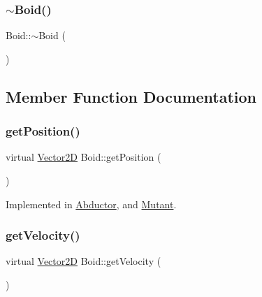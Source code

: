\hypertarget{class_boid_a712f84ddc1b8ad06ad7ecd6c10a1666c}{}\label{class_boid_a712f84ddc1b8ad06ad7ecd6c10a1666c} 
\subsubsection{\texorpdfstring{$\sim$\+Boid()}{~Boid()}}
{\footnotesize\ttfamily Boid\+::$\sim$\+Boid (\begin{DoxyParamCaption}{ }\end{DoxyParamCaption})\hspace{0.3cm}{\ttfamily [virtual]}}



\subsection{Member Function Documentation}
\hypertarget{class_boid_a32f7601f73e7a109bbd79d43b15d2272}{}\label{class_boid_a32f7601f73e7a109bbd79d43b15d2272} 
\subsubsection{\texorpdfstring{get\+Position()}{getPosition()}}
{\footnotesize\ttfamily virtual \hyperlink{class_vector2_d}{Vector2D} Boid\+::get\+Position (\begin{DoxyParamCaption}{ }\end{DoxyParamCaption})\hspace{0.3cm}{\ttfamily [pure virtual]}}



Implemented in \hyperlink{class_abductor_a9b01cf2a2870454fe621a7bc5a2828e5}{Abductor}, and \hyperlink{class_mutant_a9c3ab53037fc85159e02643ecfe46717}{Mutant}.

\hypertarget{class_boid_a58472dead1db1399b75090bf48184619}{}\label{class_boid_a58472dead1db1399b75090bf48184619} 
\subsubsection{\texorpdfstring{get\+Velocity()}{getVelocity()}}
{\footnotesize\ttfamily virtual \hyperlink{class_vector2_d}{Vector2D} Boid\+::get\+Velocity (\begin{DoxyParamCaption}{ }\end{DoxyParamCaption})\hspace{0.3cm}{\ttfamily [pure virtual]}}



